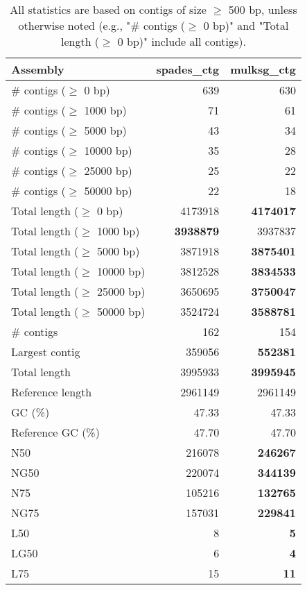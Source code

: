 \documentclass[12pt,a4paper]{article}
\begin{document}
\begin{table}[ht]
\begin{center}
\caption{All statistics are based on contigs of size $\geq$ 500 bp, unless otherwise noted (e.g., "\# contigs ($\geq$ 0 bp)" and "Total length ($\geq$ 0 bp)" include all contigs).}
\begin{tabular}{|l*{2}{|r}|}
\hline
Assembly & spades\_ctg & mulksg\_ctg \\ \hline
\# contigs ($\geq$ 0 bp) & 639 & 630 \\ \hline
\# contigs ($\geq$ 1000 bp) & 71 & 61 \\ \hline
\# contigs ($\geq$ 5000 bp) & 43 & 34 \\ \hline
\# contigs ($\geq$ 10000 bp) & 35 & 28 \\ \hline
\# contigs ($\geq$ 25000 bp) & 25 & 22 \\ \hline
\# contigs ($\geq$ 50000 bp) & 22 & 18 \\ \hline
Total length ($\geq$ 0 bp) & 4173918 & {\bf 4174017} \\ \hline
Total length ($\geq$ 1000 bp) & {\bf 3938879} & 3937837 \\ \hline
Total length ($\geq$ 5000 bp) & 3871918 & {\bf 3875401} \\ \hline
Total length ($\geq$ 10000 bp) & 3812528 & {\bf 3834533} \\ \hline
Total length ($\geq$ 25000 bp) & 3650695 & {\bf 3750047} \\ \hline
Total length ($\geq$ 50000 bp) & 3524724 & {\bf 3588781} \\ \hline
\# contigs & 162 & 154 \\ \hline
Largest contig & 359056 & {\bf 552381} \\ \hline
Total length & 3995933 & {\bf 3995945} \\ \hline
Reference length & 2961149 & 2961149 \\ \hline
GC (\%) & 47.33 & 47.33 \\ \hline
Reference GC (\%) & 47.70 & 47.70 \\ \hline
N50 & 216078 & {\bf 246267} \\ \hline
NG50 & 220074 & {\bf 344139} \\ \hline
N75 & 105216 & {\bf 132765} \\ \hline
NG75 & 157031 & {\bf 229841} \\ \hline
L50 & 8 & {\bf 5} \\ \hline
LG50 & 6 & {\bf 4} \\ \hline
L75 & 15 & {\bf 11} \\ \hline

\end{tabular}
\end{center}
\end{table}
\end{document}
